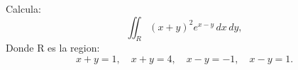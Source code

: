 Calcula:
\[
\iint_R (x+y)^2 e^{x-y} \, dx \, dy,
\]
Donde R es la region:
\[
x + y = 1, \quad x + y = 4, \quad x - y = -1, \quad x - y = 1.
\]
